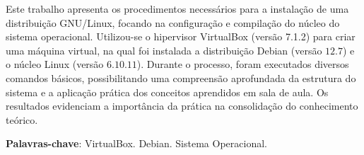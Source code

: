 \documentclass[
	12pt,				%
	oneside,   	        %
	a4paper,			%
	english,			%
	french,				%
	spanish,			%
	brazil,				%
	]{pacotes/abntex2}
\begin{document}
\frenchspacing 



\imprimirfolhaderosto



\begin{resumo}
Este trabalho apresenta os procedimentos necessários para a instalação de uma distribuição GNU/Linux, focando na configuração e compilação do núcleo do sistema operacional. Utilizou-se o hipervisor VirtualBox (versão 7.1.2) para criar uma máquina virtual, na qual foi instalada a distribuição Debian (versão $12.7$) e o núcleo Linux (versão $6.10.11$). Durante o processo, foram executados diversos comandos básicos, possibilitando uma compreensão aprofundada da estrutura do sistema e a aplicação prática dos conceitos aprendidos em sala de aula. Os resultados evidenciam a importância da prática na consolidação do conhecimento teórico.

 \vspace{\onelineskip}
    
 \noindent
 \textbf{Palavras-chave}: VirtualBox. Debian. Sistema Operacional.
\end{resumo}




\tableofcontents*
\cleardoublepage

\textual
\end{document}
